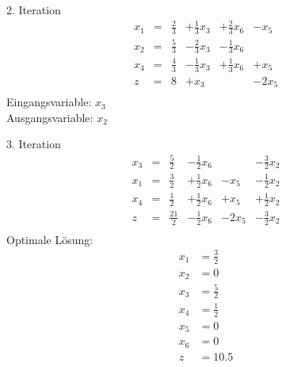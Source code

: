 \documentclass[a4paper]{scrartcl}
\begin{document}
\begin{enumerate}
\begin{enumerate}
                        2. Iteration
                        \begin{equation}
                            \begin{array}{rcrrrr}
                                x_1 & = & \frac{2}{3} & +\frac{1}{3}x_3 & +\frac{2}{3}x_6 & -x_5 \\
                                x_2 & = & \frac{5}{3} & -\frac{2}{3}x_3 & -\frac{1}{3}x_6 & \\
                                x_4 & = & \frac{4}{3} & -\frac{1}{3}x_3 & +\frac{1}{3}x_6 & +x_5 \\
                                \hline
                                z   & = & 8 & +x_3 & & -2x_5 \\
                            \end{array}
                        \end{equation}
                        Eingangsvariable: $x_3$ \\
                        Ausgangsvariable: $x_2$

                        3. Iteration
                        \begin{equation}
                            \begin{array}{rcrrrr}
                                x_3 & = & \frac{5}{2} & -\frac{1}{2}x_6 & & -\frac{3}{2}x_2 \\
                                x_1 & = & \frac{3}{2} & +\frac{1}{2}x_6 & -x_5 & -\frac{1}{2}x_2 \\
                                x_4 & = & \frac{1}{2} & +\frac{1}{2}x_6 & +x_5 & +\frac{1}{2}x_2 \\
                                \hline
                                z   & = & \frac{21}{2} & -\frac{1}{2}x_6 & -2x_5 & -\frac{3}{2}x_2 \\
                            \end{array}
                        \end{equation}
                        Optimale Lösung:
                        \begin{equation}
                            \begin{split}
                                x_1 &= \frac{3}{2} \\
                                x_2 &= 0 \\
                                x_3 &= \frac{5}{2} \\
                                x_4 &= \frac{1}{2} \\
                                x_5 &= 0 \\
                                x_6 &= 0 \\
                                z   &= \num{10,5}
                            \end{split}
                        \end{equation}
                        

\end{enumerate}
\end{enumerate}
\end{document}
